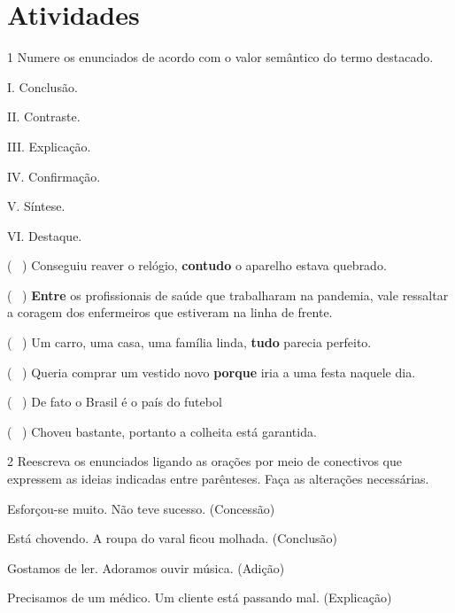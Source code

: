 \section{Atividades}

\num{1} Numere os enunciados de acordo com o valor semântico do termo
destacado.

\begin{multicols}{2}
I. Conclusão.

II. Contraste. 

III. Explicação.

IV. Confirmação. 

V. Síntese. 

VI. Destaque.

\columnbreak

(~ ) Conseguiu reaver o relógio, \textbf{contudo} o aparelho
estava quebrado. 

(~ ) \textbf{Entre} os profissionais de
saúde que trabalharam na pandemia, vale ressaltar a coragem dos
enfermeiros que estiveram na linha de frente. 

(~ ) Um carro, uma casa, uma família linda, \textbf{tudo} parecia perfeito. 

(~ ) Queria comprar um vestido novo \textbf{porque} iria a uma
festa naquele dia. 

(~ ) De fato o Brasil é o país do futebol

(~ ) Choveu bastante, portanto a colheita está garantida.
\end{multicols}

\num{2} Reescreva os enunciados ligando as orações por meio de
conectivos que expressem as ideias indicadas entre parênteses. Faça as
alterações necessárias.

\begin{escolha}
\item Esforçou-se muito. Não teve sucesso. (Concessão)


\item Está chovendo. A roupa do varal ficou molhada. (Conclusão)


\item Gostamos de ler. Adoramos ouvir música. (Adição)


\item Precisamos de um médico. Um cliente está passando mal. (Explicação)

\end{escolha}


